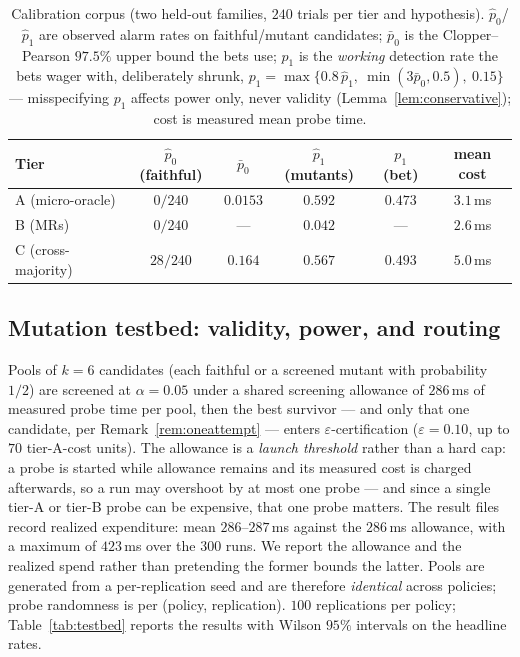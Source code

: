 \documentclass[pdflatex,sn-mathphys-num]{sn-jnl}
\theoremstyle{thmstyleone}
\theoremstyle{thmstyletwo}
\begin{document}
\begin{table}[t]
\caption{Calibration corpus (two held-out families, $240$ trials per
tier and hypothesis). $\hat p_0$/$\hat p_1$ are observed alarm rates
on faithful/mutant candidates; $\bar p_0$ is the Clopper--Pearson
$97.5\%$ upper bound the bets use; $p_1$ is the \emph{working}
detection rate the bets wager with, deliberately shrunk,
$p_1 = \max\{0.8\,\hat p_1,\ \min(3\bar p_0, 0.5),\ 0.15\}$ ---
misspecifying $p_1$ affects power only, never validity
(Lemma~\ref{lem:conservative}); cost is measured mean probe time.}
\label{tab:calib}
\begin{tabular}{lccccc}
\toprule
Tier & $\hat p_0$ (faithful) & $\bar p_0$ & $\hat p_1$ (mutants) &
$p_1$ (bet) & mean cost\\
\midrule
A (micro-oracle)   & $0/240$   & $0.0153$ & $0.592$ & $0.473$ & $3.1$\,ms\\
B (MRs)            & $0/240$   & ---      & $0.042$ & ---     & $2.6$\,ms\\
C (cross-majority) & $28/240$  & $0.164$  & $0.567$ & $0.493$ & $5.0$\,ms\\
\bottomrule
\end{tabular}
\end{table}

\subsection{Mutation testbed: validity, power, and routing}
\label{sec:testbed}

Pools of $k = 6$ candidates (each faithful or a screened mutant with
probability $1/2$) are screened at $\alpha = 0.05$ under a shared
screening allowance of $286$\,ms of measured probe time per pool, then the best
survivor --- and only that one candidate, per
Remark~\ref{rem:oneattempt} --- enters $\varepsilon$-certification
($\varepsilon = 0.10$, up to $70$ tier-A-cost units). The allowance is a \emph{launch threshold} rather than a hard cap:
a probe is started while allowance remains and its measured cost is
charged afterwards, so a run may overshoot by at most one probe ---
and since a single tier-A or tier-B probe can be expensive, that one
probe matters. The result files record realized expenditure: mean
$286$--$287$\,ms against the $286$\,ms allowance, with a maximum of
$423$\,ms over the $300$ runs.  We report the allowance and the
realized spend rather than pretending the former bounds the latter. Pools are
generated from a per-replication seed and are therefore
\emph{identical} across policies; probe randomness is per
(policy, replication). $100$ replications per policy;
Table~\ref{tab:testbed} reports the results with Wilson $95\%$
intervals on the headline rates.
\end{document}
